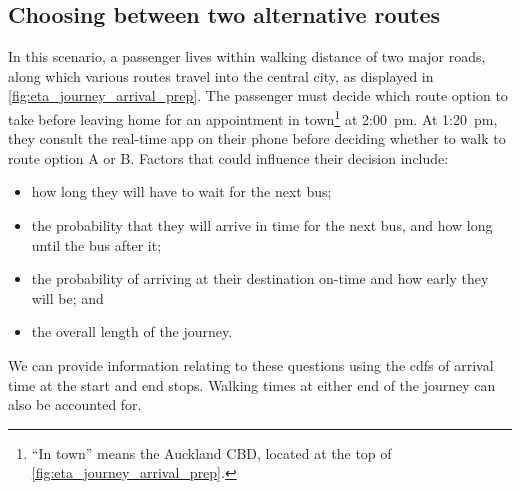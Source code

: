 \subsection{Choosing between two alternative routes}
\label{sec:journey_simple}

In this scenario, a passenger lives within walking distance of two major roads, along which various routes travel into the central city, as displayed in \cref{fig:eta_journey_arrival_prep}. The passenger must decide which route option to take before leaving home for an appointment in town\footnote{``In town'' means the Auckland CBD, located at the top of \cref{fig:eta_journey_arrival_prep}.} at  2:00~pm. At  1:20~pm, they consult the real-time app on their phone before deciding whether to walk to route option A or B. Factors that could influence their decision include:
\begin{itemize}
\item how long they will have to wait for the next bus;
\item the probability that they will arrive in time for the next bus, and how long until the bus after it;
\item the probability of arriving at their destination on-time and how early they will be; and
\item the overall length of the journey.
\end{itemize}
We can provide information relating to these questions using the \glspl{cdf} of arrival time at the start and end stops. Walking times at either end of the journey can also be accounted for.



